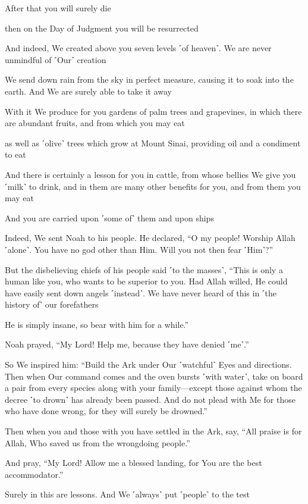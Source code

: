 After that you will surely die

then on the Day of Judgment you will be resurrected

And indeed, We created above you seven levels ˹of heaven˺. We are never unmindful of ˹Our˺ creation

We send down rain from the sky in perfect measure, causing it to soak into the earth. And We are surely able to take it away

With it We produce for you gardens of palm trees and grapevines, in which there are abundant fruits, and from which you may eat

as well as ˹olive˺ trees which grow at Mount Sinai, providing oil and a condiment to eat

And there is certainly a lesson for you in cattle, from whose bellies We give you ˹milk˺ to drink, and in them are many other benefits for you, and from them you may eat

And you are carried upon ˹some of˺ them and upon ships

Indeed, We sent Noah to his people. He declared, “O my people! Worship Allah ˹alone˺. You have no god other than Him. Will you not then fear ˹Him˺?”

But the disbelieving chiefs of his people said ˹to the masses˺, “This is only a human like you, who wants to be superior to you. Had Allah willed, He could have easily sent down angels ˹instead˺. We have never heard of this in ˹the history of˺ our forefathers

He is simply insane, so bear with him for a while.”

Noah prayed, “My Lord! Help me, because they have denied ˹me˺.”

So We inspired him: “Build the Ark under Our ˹watchful˺ Eyes and directions. Then when Our command comes and the oven bursts ˹with water˺, take on board a pair from every species along with your family—except those against whom the decree ˹to drown˺ has already been passed. And do not plead with Me for those who have done wrong, for they will surely be drowned.”

Then when you and those with you have settled in the Ark, say, “All praise is for Allah, Who saved us from the wrongdoing people.”

And pray, “My Lord! Allow me a blessed landing, for You are the best accommodator.”

Surely in this are lessons. And We ˹always˺ put ˹people˺ to the test

